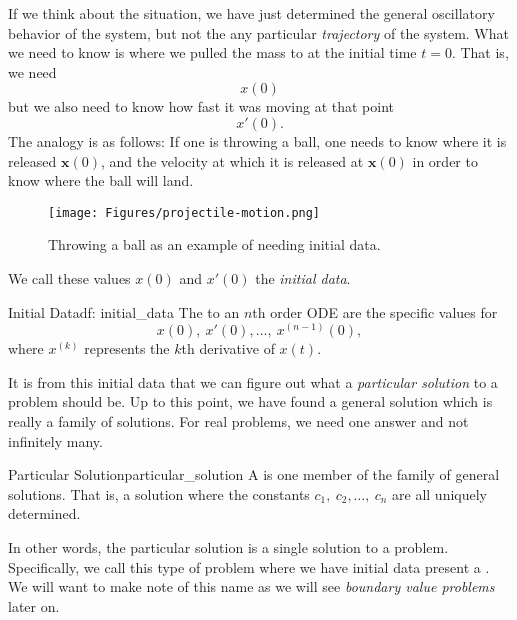         If we think about the situation, we have just determined the general oscillatory behavior of the system, but not the any particular \emph{trajectory} of the system. What we need to know is where we pulled the mass to at the initial time $t=0$. That is, we need
        \[
        x(0)
        \]
        but we also need to know how fast it was moving at that point
        \[
        x'(0).
        \]
        The analogy is as follows: If one is throwing a ball, one needs to know where it is released $\mathbf{x}(0)$, and the velocity at which it is released at $\mathbf{x}(0)$ in order to know where the ball will land.
        \begin{figure}[H]
            \centering
            \texttt{[image: Figures/projectile-motion.png]}
            \caption{Throwing a ball as an example of needing initial data.}
            \label{fig:proj_motion}
        \end{figure}
        \noindent We call these values $x(0)$ and $x'(0)$ the \emph{initial data}.

        \begin{df}{Initial Data}{df: initial_data}
            The   to an $n$th order ODE are the specific values for
            \[
            x(0),~ x'(0),\dots,~ x^{(n-1)}(0),
            \]
            where $x^{(k)}$ represents the $k$th derivative of $x(t)$.
        \end{df}

        \noindent It is from this initial data that we can figure out what a \emph{particular solution} to a problem should be.  Up to this point, we have found a general solution which is really a family of solutions. For real problems, we need one answer and not infinitely many.

        \begin{df}{Particular Solution}{particular_solution}
            A  is one member of the family of general solutions.  That is, a solution where the constants $c_1,~c_2,\dots,~c_n$ are all uniquely determined.
        \end{df}

        \noindent In other words, the particular solution is a single solution to a problem.  Specifically, we call this type of problem where we have initial data present a  .  We will want to make note of this name as we will see \emph{boundary value problems} later on.

